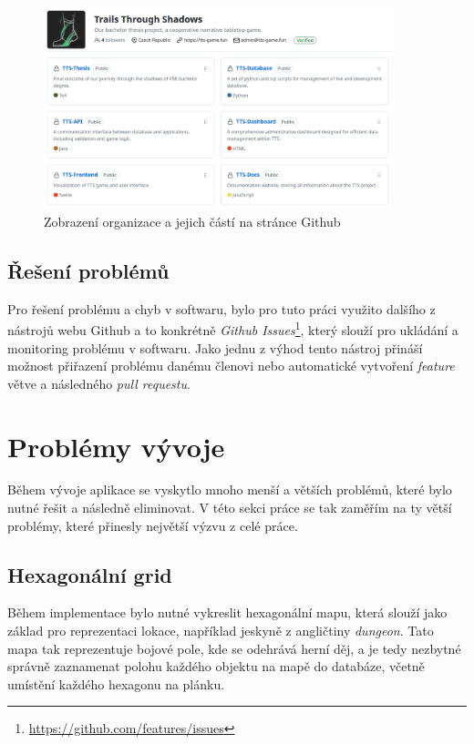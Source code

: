 \begin{figure}[H]
    \centering
    \includegraphics[width=0.9\textwidth]{../../shared/figures/gitOrg}
    \caption{Zobrazení organizace a jejich částí na stránce Github}
    \label{fig:git_organization}
\end{figure}

\subsection{Řešení problémů}
\label{subsec:implementation-collaboration-problems}
Pro řešení problému a chyb v softwaru, bylo pro tuto práci využito dalšího z nástrojů webu Github a to konkrétně \textit{Github Issues}\footnote{\href{https://github.com/features/issues}{https://github.com/features/issues}}, který slouží pro ukládání a monitoring problému v softwaru. Jako jednu z výhod tento nástroj přináší možnost přiřazení problému danému členovi nebo automatické vytvoření \textit{feature} větve a následného \textit{pull requestu}.

\newpage
\section{Problémy vývoje}
\label{sec:implementation-problems}
Během vývoje aplikace se vyskytlo mnoho menší a větších problémů, které bylo nutné řešit a následně eliminovat. V této sekci práce se tak zaměřím na ty větší problémy, které přinesly největší výzvu z celé práce.

\subsection*{Hexagonální grid}
\label{subsec:implementation-problems-hexagon}
Během implementace bylo nutné vykreslit hexagonální mapu, která slouží jako základ pro reprezentaci lokace, například jeskyně z angličtiny \textit{dungeon}. Tato mapa tak reprezentuje bojové pole, kde se odehrává herní děj, a je tedy nezbytné správně zaznamenat polohu každého objektu na mapě do databáze, včetně umístění každého hexagonu na plánku.

